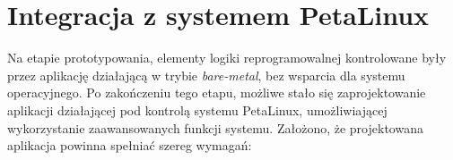 
\section{Integracja z systemem PetaLinux}

Na etapie prototypowania, elementy logiki reprogramowalnej kontrolowane były przez aplikację działającą w trybie \textit{bare-metal}, bez wsparcia dla systemu operacyjnego.
Po zakończeniu tego etapu, możliwe stało się zaprojektowanie aplikacji działającej pod kontrolą systemu PetaLinux, umożliwiającej wykorzystanie zaawansowanych funkcji systemu.
Założono, że projektowana aplikacja powinna spełniać szereg wymagań:

